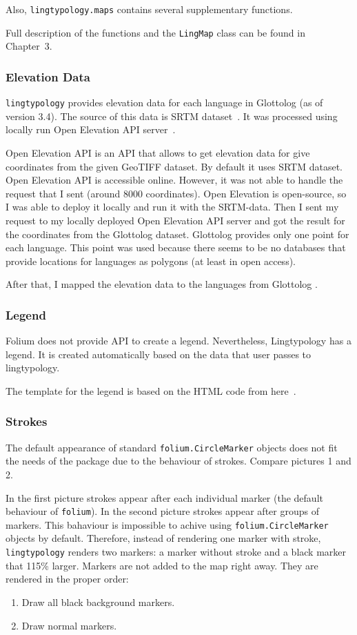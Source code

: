 \documentclass[a4paper,12pt]{article}
\begin{document}
Also, \texttt{lingtypology.maps} contains several supplementary functions.

Full description of the functions and the \texttt{LingMap} class can be found in Chapter~3.

\subsubsection{Elevation Data}
\texttt{lingtypology} provides elevation data for each language in Glottolog (as of version 3.4). The source of this data is SRTM dataset~\parencite{SRTM}.
It was processed using locally run Open Elevation API server~\parencite{OpenElevation}.

Open Elevation API is an API that allows to get elevation data for give coordinates from the given GeoTIFF dataset. By default it uses SRTM dataset. Open Elevation API is accessible online. However, it was not able to handle the request that I sent (around 8000 coordinates). Open Elevation is open-source, so I was able to deploy it locally and run it with the SRTM-data. Then I sent my request to my locally deployed Open Elevation API server and got the result for the coordinates from the Glottolog dataset. Glottolog provides only one point for each language. This point was used because there seems to be no databases that provide locations for languages as polygons (at least in open access).

After that, I mapped the elevation data to the languages from Glottolog \parencite[language\_elevation\_mapping.json]{MichaelVoronov2019}.

\subsubsection{Legend}
Folium does not provide API to create a legend. Nevertheless, Lingtypology has a legend. It is created automatically based on the data that user passes to lingtypology.

The template for the legend is based on the HTML code from here~\parencite{legend}.

\subsubsection{Strokes}
The default appearance of standard \texttt{folium.CircleMarker} objects does not fit the needs of the package due to the behaviour of strokes. Compare pictures 1 and 2.

In the first picture strokes appear after each individual marker (the default behaviour of \texttt{folium}).
In the second picture strokes appear after groups of markers. This bahaviour is impossible to achive using \texttt{folium.CircleMarker} objects by default. Therefore, instead of rendering one marker with stroke, \texttt{lingtypology} renders two markers: a marker without stroke and a black marker that 115\% larger. Markers are not added to the map right away. They are rendered in the proper order:
\begin{enumerate}
 \item Draw all black background markers.
 \item Draw normal markers.
\end{enumerate}
\end{document}
